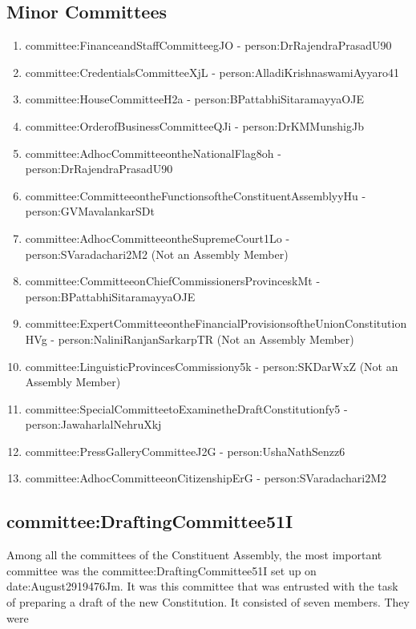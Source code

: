 \subsection{Minor Committees}

\begin{enumerate}
  \item \gls{committee:FinanceandStaffCommitteegJO} - \gls{person:DrRajendraPrasadU90}
  \item \gls{committee:CredentialsCommitteeXjL} - \gls{person:AlladiKrishnaswamiAyyaro41}
  \item \gls{committee:HouseCommitteeH2a} - \gls{person:BPattabhiSitaramayyaOJE}
  \item \gls{committee:OrderofBusinessCommitteeQJi} - \gls{person:DrKMMunshigJb}
  \item \gls{committee:AdhocCommitteeontheNationalFlag8oh} - \gls{person:DrRajendraPrasadU90}
  \item \gls{committee:CommitteeontheFunctionsoftheConstituentAssemblyyHu} - \gls{person:GVMavalankarSDt}
  \item \gls{committee:AdhocCommitteeontheSupremeCourt1Lo} - \gls{person:SVaradachari2M2} (Not an Assembly Member)
  \item \gls{committee:CommitteeonChiefCommissionersProvinceskMt} - \gls{person:BPattabhiSitaramayyaOJE}
  \item \gls{committee:ExpertCommitteeontheFinancialProvisionsoftheUnionConstitutionHVg} - \gls{person:NaliniRanjanSarkarpTR} (Not an Assembly Member)
  \item \gls{committee:LinguisticProvincesCommissiony5k} - \gls{person:SKDarWxZ} (Not an Assembly Member)
  \item \gls{committee:SpecialCommitteetoExaminetheDraftConstitutionfy5} - \gls{person:JawaharlalNehruXkj}
  \item \gls{committee:PressGalleryCommitteeJ2G} - \gls{person:UshaNathSenzz6}
  \item \gls{committee:AdhocCommitteeonCitizenshipErG} - \gls{person:SVaradachari2M2}
\end{enumerate}


\subsection{\gls{committee:DraftingCommittee51I}}

Among all the committees of the Constituent Assembly, the most important committee was the \gls{committee:DraftingCommittee51I} set up on \gls{date:August2919476Jm}. It was this committee that was entrusted with the task of preparing a draft of the new Constitution. It consisted of seven members. They were

